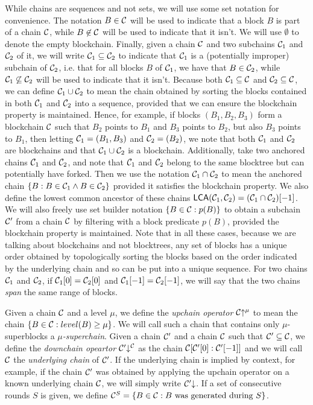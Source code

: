 While chains are sequences and not sets, we will use some set notation for
convenience. The notation $B \in \mathcal{C}$ will be used to indicate that a block
$B$ is part of a chain $\mathcal{C}$, while $B \not\in \mathcal{C}$ will be used to
indicate that it isn't. We will use $\emptyset$ to denote the empty blockchain.
Finally, given a chain $\mathcal{C}$ and two subchains $\mathcal{C}_1$ and $\mathcal{C}_2$ of
it, we will write $\mathcal{C}_1 \subseteq \mathcal{C}_2$ to indicate that $\mathcal{C}_1$ is a
(potentially improper) subchain of $\mathcal{C}_2$, i.e. that for all blocks $B$ of
$\mathcal{C}_1$, we have that $B \in \mathcal{C}_2$, while $\mathcal{C}_1 \not\subseteq
\mathcal{C}_2$ will be used to indicate that it isn't. Because both $\mathcal{C}_1
\subseteq \mathcal{C}$ and $\mathcal{C}_2 \subseteq \mathcal{C}$, we can define $\mathcal{C}_1 \cup
\mathcal{C}_2$ to mean the chain obtained by sorting the blocks contained in both
$\mathcal{C}_1$ and $\mathcal{C}_2$ into a sequence, provided that we can ensure the
blockchain property is maintained. Hence, for example, if blocks $(B_1, B_2,
B_3)$ form a blockchain $\mathcal{C}$ such that $B_2$ points to $B_1$ and $B_3$
points to $B_2$, but also $B_3$ points to $B_1$, then letting $\mathcal{C}_1 = (B_1,
B_3)$ and $\mathcal{C}_2 = (B_2)$, we note that both $\mathcal{C}_1$ and $\mathcal{C}_2$ are
blockchains and that $\mathcal{C}_1 \cup \mathcal{C}_2$ is a blockchain. Additionally,
take two anchored chains $\mathcal{C}_1$ and $\mathcal{C}_2$, and note that $\mathcal{C}_1$ and
$\mathcal{C}_2$ belong to the same blocktree but can potentially have forked. Then we
use the notation $\mathcal{C}_1 \cap \mathcal{C}_2$ to mean the anchored chain $\{B: B \in
\mathcal{C}_1 \land B \in \mathcal{C}_2\}$ provided it satisfies the blockchain property.
We also define the lowest common ancestor of these chains $\textsf{LCA}(\mathcal{C}_1,
\mathcal{C}_2) = (\mathcal{C}_1 \cap \mathcal{C}_2)[-1]$. We will also freely use set builder
notation $\{B \in \mathcal{C}: p(B)\}$ to obtain a subchain $\mathcal{C}'$ from a chain
$\mathcal{C}$ by filtering with a block predicate $p(B)$, provided the blockchain
property is maintained. Note that in all these cases, because we are talking
about blockchains and not blocktrees, any set of blocks has a unique order
obtained by topologically sorting the blocks based on the order indicated by the
underlying chain and so can be put into a unique sequence. For two chains
$\mathcal{C}_1$ and $\mathcal{C}_2$, if $\mathcal{C}_1[0] = \mathcal{C}_2[0]$ and $\mathcal{C}_1[-1] =
\mathcal{C}_2[-1]$, we will say that the two chains \textit{span} the same range of
blocks.

Given a chain $\mathcal{C}$ and a level $\mu$, we define the \textit{upchain
operator} $\mathcal{C}\negthickspace\uparrow^\mu$ to mean the chain $\{B \in \mathcal{C}: level(B) \geq
\mu\}$. We will call such a chain that contains only $\mu$-superblocks a
$\mu$\textit{-superchain}. Given a chain $\mathcal{C}'$ and a chain $\mathcal{C}$ such
that $\mathcal{C}' \subseteq \mathcal{C}$, we define the \textit{downchain opeartor}
$\mathcal{C}'\negthickspace\downarrow^{\mathcal{C}}$ as the chain $\mathcal{C}[\mathcal{C}'[0]:\mathcal{C}'[-1]]$ and we
will call $\mathcal{C}$ the \textit{underlying chain} of $\mathcal{C}'$. If the underlying
chain is implied by context, for example, if the chain $\mathcal{C}'$ was obtained by
applying the upchain operator on a known underlying chain $\mathcal{C}$, we will
simply write $\mathcal{C}'\negthickspace\downarrow$. If a set of consecutive rounds $S$ is given,
we define $\mathcal{C}^S = \{B \in \mathcal{C}: B \textnormal{ was generated during } S\}$.
